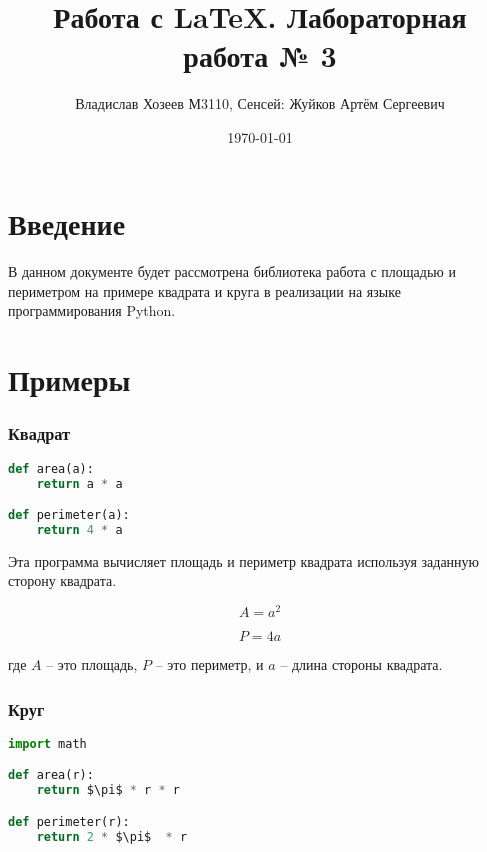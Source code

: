 \documentclass{article}
\title{Работа с LaTeX. Лабораторная работа № 3}
\author{Владислав Хозеев М3110, Сенсей:  Жуйков Артём Сергеевич}
\date{\today}
\begin{document}
\maketitle

\tableofcontents
\newpage
\section{Введение}
    \paragraph{} В данном документе будет рассмотрена библиотека работа с площадью и периметром на примере квадрата и круга в реализации на языке программирования Python.
    

\section{Примеры}


\subsubsection{Квадрат}

\begin{lstlisting}[language=Python]
def area(a):
    return a * a

def perimeter(a):
    return 4 * a
\end{lstlisting}

Эта программа вычисляет площадь и периметр квадрата используя заданную сторону квадрата.

\begin{equation}
A = a^2
\end{equation}

\begin{equation}
P = 4a
\end{equation}

где $A$ -- это площадь, $P$ -- это периметр, и $a$ -- длина стороны квадрата.


\subsubsection{Круг}

\begin{lstlisting}[language=Python]
import math

def area(r):
    return $\pi$ * r * r

def perimeter(r):
    return 2 * $\pi$  * r
\end{lstlisting}
\end{document}
